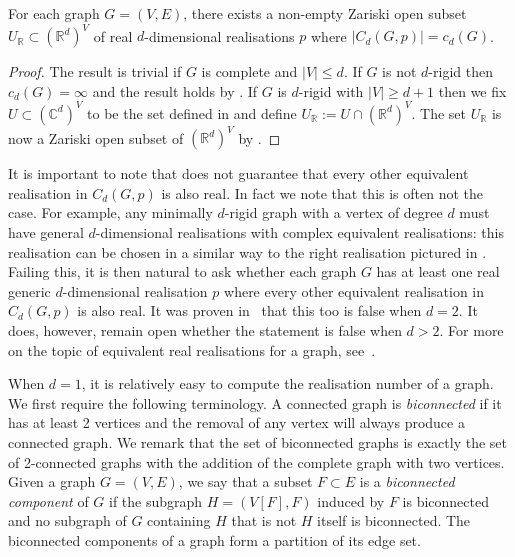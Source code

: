 \begin{corollary}\label{cor:realstuff}
	For each graph $G=(V,E)$,
	there exists a non-empty Zariski open subset $U_\mathbb{R} \subset (\mathbb{R}^d)^V$ of real $d$-dimensional realisations $p$ where $|C_d(G,p)| = c_d(G)$.
\end{corollary}

\begin{proof}
	The result is trivial if $G$ is complete and $|V| \leq d$.	
	If $G$ is not $d$-rigid then $c_d(G) = \infty$ and the result holds by .
	If $G$ is $d$-rigid with $|V| \geq d+1$ then we fix $U \subset (\mathbb{C}^d)^V$ to be the set defined in  and define $U_{\mathbb{R}} := U \cap (\mathbb{R}^d)^V$.
	The set $U_{\mathbb{R}}$ is now a Zariski open subset of $(\mathbb{R}^d)^V$ by .
\end{proof}

It is important to note that  does not guarantee that every other equivalent realisation in $C_d(G,p)$ is also real.
In fact we note that this is often not the case.
For example, any minimally $d$-rigid graph with a vertex of degree $d$ must have general $d$-dimensional realisations with complex equivalent realisations:
this realisation can be chosen in a similar way to the right realisation pictured in .
Failing this,
it is then natural to ask whether each graph $G$ has at least one real generic $d$-dimensional realisation $p$ where every other equivalent realisation in $C_d(G,p)$ is also real.
It was proven in~\cite{JacksonOwen} that this too is false when $d=2$.
It does, however, remain open whether the statement is false when $d>2$.
For more on the topic of equivalent real realisations for a graph,
see~\cite{Bartzos2021}.


When $d=1$, it is relatively easy to compute the realisation number of a graph.
We first require the following terminology.
A connected graph is \emph{biconnected} if it has at least 2 vertices and the removal of any vertex will always produce a connected graph.
We remark that the set of biconnected graphs is exactly the set of 2-connected graphs with the addition of the complete graph with two vertices.
Given a graph $G=(V,E)$, we say that a subset $F \subset E$ is a \emph{biconnected component} of $G$ if the subgraph $H=(V[F],F)$ induced by $F$ is biconnected and no subgraph of $G$ containing $H$ that is not $H$ itself is biconnected.
The biconnected components of a graph form a partition of its edge set.

